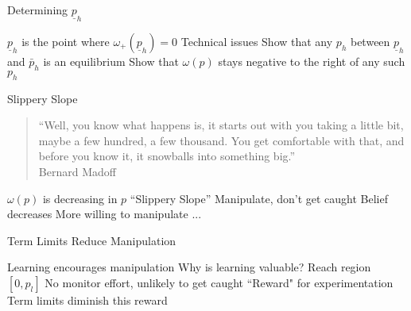 \documentclass[usenames,dvipsnames]{beamer}
\newcommand{\bo}{\begin{outline}}
\newcommand{\eo}{\end{outline}}
\begin{document}
\begin{frame}{Determining $\underline{p}_h$}\label{frame:End-Eq-Constr}
\bo
\1 $\underline{p}_h$ is the point where $\omega_{+}(\underline{p}_h)=0$
\1 Technical issues
\2 Show that any $p_h$ between $\underline{p}_h$ and $\bar{p}_h$ is an equilibrium
\2 Show that $\omega(p)$ stays negative to the right of any such $p_h$
\eo
\bigskip
\hfill \hyperlink{frame:Small-R}{}
\end{frame}


\begin{frame}{Slippery Slope}
\begin{quote}
        ``Well, you know what happens is, it starts out with you taking a little bit, maybe a few hundred, a few thousand. You get comfortable with that, and before you know it, it snowballs into something big.'' \\ \hfill Bernard Madoff
\end{quote}
\bo
\1 $\omega(p)$ is decreasing in $p$
\1 ``Slippery Slope''
\2 Manipulate, don't get caught
\2 Belief decreases
\2 More willing to manipulate
\2 ...
\eo
\end{frame}

\begin{frame}{Term Limits Reduce Manipulation}
\bo
\1 Learning encourages manipulation
\1 Why is learning valuable?
\2 Reach region $[0,p_l]$
\2 No monitor effort, unlikely to get caught
\2 ``Reward" for experimentation
\1 Term limits diminish this reward
\eo 
\end{frame}
\end{document}
